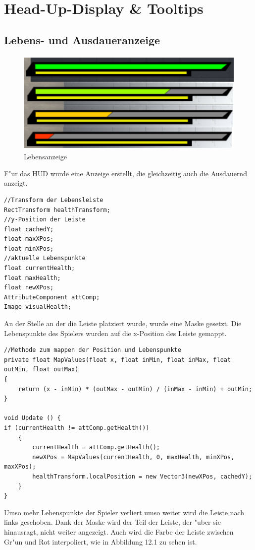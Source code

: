 \chapter{Head-Up-Display \& Tooltips}

\section{Lebens- und Ausdaueranzeige}
\begin{figure}
	\centering
	\includegraphics[height=5cm]{images/Lebensleiste.png}
	\caption{Lebensanzeige}
	\label{fig:Lebensanzeige-HUD}
\end{figure}

F"ur das HUD wurde eine Anzeige erstellt, die gleichzeitig auch die Ausdauernd anzeigt. \newline
\begin{lstlisting}[breaklines=true]
//Transform der Lebensleiste
RectTransform healthTransform;
//y-Position der Leiste
float cachedY;
float maxXPos;
float minXPos;
//aktuelle Lebenspunkte
float currentHealth;
float maxHealth;
float newXPos;
AttributeComponent attComp;
Image visualHealth;
\end{lstlisting}
\newpage
An der Stelle an der die Leiste platziert wurde, wurde eine Maske gesetzt. Die Lebenspunkte des Spielers wurden auf die x-Position des Leiste gemappt.\newline

\begin{lstlisting}[breaklines=true]
//Methode zum mappen der Position und Lebenspunkte
private float MapValues(float x, float inMin, float inMax, float outMin, float outMax)
{
	return (x - inMin) * (outMax - outMin) / (inMax - inMin) + outMin;
}

void Update () {
if (currentHealth != attComp.getHealth())
	{
		currentHealth = attComp.getHealth();
		newXPos = MapValues(currentHealth, 0, maxHealth, minXPos, maxXPos);
		healthTransform.localPosition = new Vector3(newXPos, cachedY);
	}
}
\end{lstlisting}
Umso mehr Lebenspunkte der Spieler verliert umso weiter wird die Leiste nach links geschoben. Dank der Maske wird der Teil der Leiste, der "uber sie hinausragt, nicht weiter angezeigt. \newline
\newline Auch wird die Farbe der Leiste zwischen Gr"un und Rot interpoliert, wie in Abbildung 12.1 zu sehen ist.

